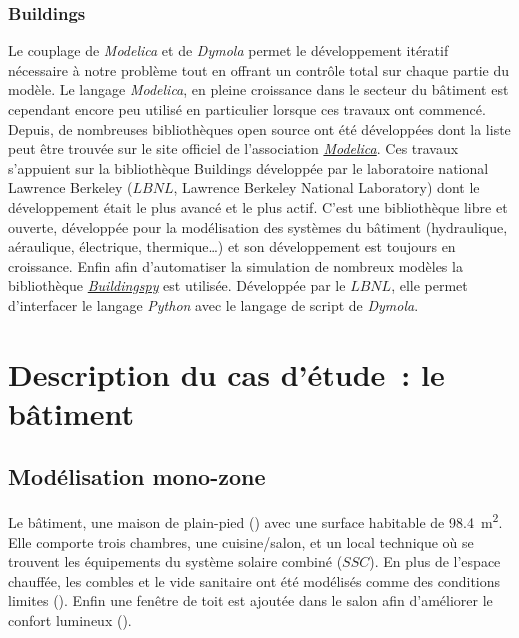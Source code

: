 \subsubsection{Buildings} %
\label{ssub:buildings}
Le couplage de \textit{Modelica} et de \textit{Dymola} permet le développement itératif
nécessaire à notre problème tout en offrant un contrôle total sur chaque partie du modèle.
Le langage \textit{Modelica}, en pleine croissance dans le secteur du bâtiment est cependant
encore peu utilisé en particulier lorsque ces travaux ont commencé. Depuis, de nombreuses
bibliothèques open source ont été développées dont la liste peut être trouvée sur le site
officiel de l’association \href{https://www.modelica.org/libraries}{\textit{Modelica}}. Ces
travaux s’appuient sur la bibliothèque Buildings \parencite{Wetter2014253} développée par le laboratoire
national Lawrence Berkeley ($LBNL$, Lawrence Berkeley National Laboratory) dont le
développement était le plus avancé et le plus actif. C’est une bibliothèque libre et
ouverte, développée pour la modélisation des systèmes du bâtiment (hydraulique,
aéraulique, électrique, thermique\dots) et son développement est toujours en croissance. Enfin
afin d’automatiser la simulation de nombreux modèles la bibliothèque
\href{http://simulationresearch.lbl.gov/modelica/buildingspy/}{\textit{Buildingspy}}
est utilisée. Développée par le $LBNL$, elle permet d’interfacer le langage \textit{Python}
avec le langage de script de \textit{Dymola}.




\section{Description du cas d’étude~: le bâtiment} %
\label{sec:description_du_cas_d_etude_le_batiment}
\subsection{Modélisation mono-zone} %
\label{sub:modelisation_monozone}
Le bâtiment, une maison de plain-pied () avec une surface habitable
de \SI{98.4}{\meter\squared}. Elle comporte trois chambres, une cuisine/salon, et un local
technique où se trouvent les équipements du système solaire combiné ($SSC$). En plus de
l’espace chauffée, les combles et le vide sanitaire ont été modélisés comme des conditions
limites (). Enfin une fenêtre de toit est ajoutée dans
le salon afin d’améliorer le confort lumineux ().

